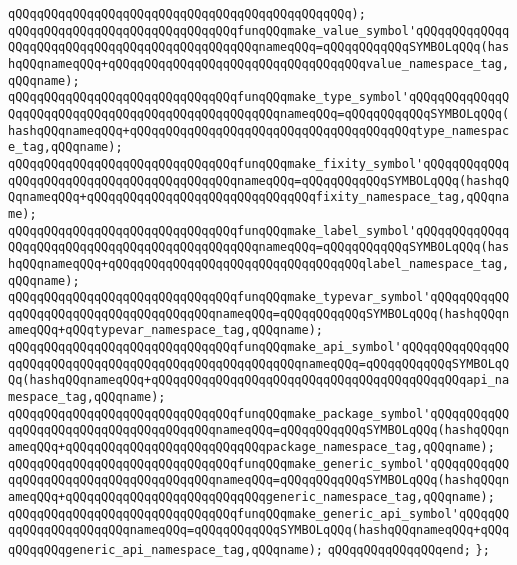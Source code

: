 \verb|qQQqqQQqqQQqqQQqqQQqqQQqqQQqqQQqqQQqqQQqqQQqqQQq);|\newline
\newline
\verb|qQQqqQQqqQQqqQQqqQQqqQQqqQQqqQQqfunqQQqmake_value_symbol'qQQqqQQqqQQqqQQqqQQqqQQqqQQqqQQqqQQqqQQqqQQqqQQqnameqQQq=qQQqqQQqqQQqSYMBOLqQQq(hashqQQqnameqQQq+qQQqqQQqqQQqqQQqqQQqqQQqqQQqqQQqqQQqvalue_namespace_tag,qQQqname);|\newline
\verb|qQQqqQQqqQQqqQQqqQQqqQQqqQQqqQQqfunqQQqmake_type_symbol'qQQqqQQqqQQqqQQqqQQqqQQqqQQqqQQqqQQqqQQqqQQqqQQqqQQqnameqQQq=qQQqqQQqqQQqSYMBOLqQQq(hashqQQqnameqQQq+qQQqqQQqqQQqqQQqqQQqqQQqqQQqqQQqqQQqqQQqtype_namespace_tag,qQQqname);|\newline
\verb|qQQqqQQqqQQqqQQqqQQqqQQqqQQqqQQqfunqQQqmake_fixity_symbol'qQQqqQQqqQQqqQQqqQQqqQQqqQQqqQQqqQQqqQQqqQQqnameqQQq=qQQqqQQqqQQqSYMBOLqQQq(hashqQQqnameqQQq+qQQqqQQqqQQqqQQqqQQqqQQqqQQqqQQqfixity_namespace_tag,qQQqname);|\newline
\verb|qQQqqQQqqQQqqQQqqQQqqQQqqQQqqQQqfunqQQqmake_label_symbol'qQQqqQQqqQQqqQQqqQQqqQQqqQQqqQQqqQQqqQQqqQQqqQQqnameqQQq=qQQqqQQqqQQqSYMBOLqQQq(hashqQQqnameqQQq+qQQqqQQqqQQqqQQqqQQqqQQqqQQqqQQqqQQqlabel_namespace_tag,qQQqname);|\newline
\verb|qQQqqQQqqQQqqQQqqQQqqQQqqQQqqQQqfunqQQqmake_typevar_symbol'qQQqqQQqqQQqqQQqqQQqqQQqqQQqqQQqqQQqqQQqnameqQQq=qQQqqQQqqQQqSYMBOLqQQq(hashqQQqnameqQQq+qQQqtypevar_namespace_tag,qQQqname);|\newline
\verb|qQQqqQQqqQQqqQQqqQQqqQQqqQQqqQQqfunqQQqmake_api_symbol'qQQqqQQqqQQqqQQqqQQqqQQqqQQqqQQqqQQqqQQqqQQqqQQqqQQqqQQqnameqQQq=qQQqqQQqqQQqSYMBOLqQQq(hashqQQqnameqQQq+qQQqqQQqqQQqqQQqqQQqqQQqqQQqqQQqqQQqqQQqqQQqapi_namespace_tag,qQQqname);|\newline
\verb|qQQqqQQqqQQqqQQqqQQqqQQqqQQqqQQqfunqQQqmake_package_symbol'qQQqqQQqqQQqqQQqqQQqqQQqqQQqqQQqqQQqqQQqnameqQQq=qQQqqQQqqQQqSYMBOLqQQq(hashqQQqnameqQQq+qQQqqQQqqQQqqQQqqQQqqQQqqQQqpackage_namespace_tag,qQQqname);|\newline
\verb|qQQqqQQqqQQqqQQqqQQqqQQqqQQqqQQqfunqQQqmake_generic_symbol'qQQqqQQqqQQqqQQqqQQqqQQqqQQqqQQqqQQqqQQqnameqQQq=qQQqqQQqqQQqSYMBOLqQQq(hashqQQqnameqQQq+qQQqqQQqqQQqqQQqqQQqqQQqqQQqgeneric_namespace_tag,qQQqname);|\newline
\verb|qQQqqQQqqQQqqQQqqQQqqQQqqQQqqQQqfunqQQqmake_generic_api_symbol'qQQqqQQqqQQqqQQqqQQqqQQqnameqQQq=qQQqqQQqqQQqSYMBOLqQQq(hashqQQqnameqQQq+qQQqqQQqqQQqgeneric_api_namespace_tag,qQQqname);|\newline
\newline
\verb|qQQqqQQqqQQqqQQqend;|\newline
\verb|};|\newline

